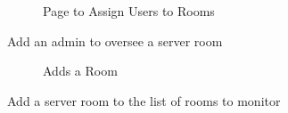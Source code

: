 \documentclass{report}
\begin{document}
%
\begin{figure}[H]
\caption{Page to Assign Users to Rooms}
\end{figure}
Add an admin to oversee a server room
\newpage

\begin{figure}[H]
\caption{Adds a Room}
\end{figure}
Add a server room to the list of rooms to monitor
\newpage
\end{document}
